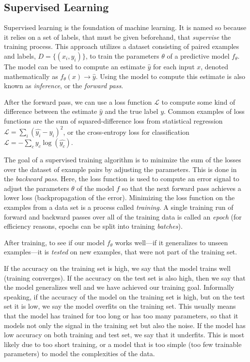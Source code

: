 \subsection{Supervised Learning} 
Supervised learning is the foundation of machine learning. It is named so because it relies on a set of  labels, that must be given beforehand, that \textit{supervise} the training process. This approach utilizes a dataset consisting of paired examples and labels, $D = \{(x_i, y_i)\}$, to train the parameters $\theta$ of a predictive model $f_\theta$. The model can be used to compute an estimate $\hat{y}$ for each input $x$, denoted mathematically as $f_\theta(x) \rightarrow \hat{y}$. Using the model to compute this estimate is also known as {\em inference}, or the {\em forward pass}. 

After the forward pass, we can use a loss function $\mathcal{L}$ to compute some kind of difference between the estimate $\hat{y}$ and the true label $y$. Common examples of loss functions are the sum of squared-difference loss from statistical regression $\mathcal{L} = \sum_i(\hat{y_i} - y_i)^2$, or the cross-entropy loss for classification $\mathcal{L} = -\sum_cy_c\log(\hat{y_c})$.
 
The goal of a supervised training algorithm is to minimize the sum of the losses over the dataset of example pairs by adjusting the parameters. This is done in the {\em backward pass}. Here, the loss function is used to compute an error signal to adjust the parameters $\theta$ of the model $f$ so that the next forward pass achieves a lower loss (backpropagation of the error). Minimizing the loss function on the examples from a data set is a process called \emph{training}. A single training run of forward and backward passes over all of the training data is called an \textit{epoch} (for efficiency reasons, epochs can be split into training \textit{batches}). 

After training, to see if our model $f_\theta$ works well---if it generalizes to unseen examples---it is \textit{tested} on new examples, that were not part of the training set. 

If the accuracy on the training set is high, we say that the model trains well (training converges). If the accuracy on the test set is also high, then we say that the model generalizes well and we have achieved our training goal. Informally speaking, if the accuracy of the model on the training set is high, but on the test set it is low, we say the model overfits on the training set. This usually means that the model has trained for too long or has too many parameters, so that it models not only the signal in the training set but also the noise. If the model has low accuracy on both training and test set, we say that it underfits. This is most likely due to too short training, or a model that is too simple (too few trainable parameters) to model the complexities of the data. 

